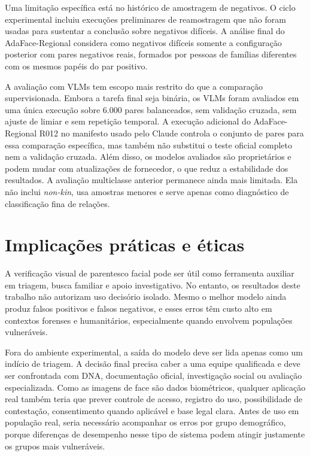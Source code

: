 Uma limitação específica está no histórico de amostragem de negativos. O ciclo experimental incluiu execuções preliminares de reamostragem que não foram usadas para sustentar a conclusão sobre negativos difíceis. A análise final do AdaFace-Regional considera como negativos difíceis somente a configuração posterior com pares negativos reais, formados por pessoas de famílias diferentes com os mesmos papéis do par positivo.

A avaliação com VLMs tem escopo mais restrito do que a comparação supervisionada. Embora a tarefa final seja binária, os VLMs foram avaliados em uma única execução sobre 6.000 pares balanceados, sem validação cruzada, sem ajuste de limiar e sem repetição temporal. A execução adicional do AdaFace-Regional R012 no manifesto usado pelo Claude controla o conjunto de pares para essa comparação específica, mas também não substitui o teste oficial completo nem a validação cruzada. Além disso, os modelos avaliados são proprietários e podem mudar com atualizações de fornecedor, o que reduz a estabilidade dos resultados. A avaliação multiclasse anterior permanece ainda mais limitada. Ela não inclui \textit{non-kin}, usa amostras menores e serve apenas como diagnóstico de classificação fina de relações.

\section{Implicações práticas e éticas}

A verificação visual de parentesco facial pode ser útil como ferramenta auxiliar em triagem, busca familiar e apoio investigativo. No entanto, os resultados deste trabalho não autorizam uso decisório isolado. Mesmo o melhor modelo ainda produz falsos positivos e falsos negativos, e esses erros têm custo alto em contextos forenses e humanitários, especialmente quando envolvem populações vulneráveis.

Fora do ambiente experimental, a saída do modelo deve ser lida apenas como um indício de triagem. A decisão final precisa caber a uma equipe qualificada e deve ser confrontada com DNA, documentação oficial, investigação social ou avaliação especializada. Como as imagens de face são dados biométricos, qualquer aplicação real também teria que prever controle de acesso, registro do uso, possibilidade de contestação, consentimento quando aplicável e base legal clara. Antes de uso em população real, seria necessário acompanhar os erros por grupo demográfico, porque diferenças de desempenho nesse tipo de sistema podem atingir justamente os grupos mais vulneráveis.

